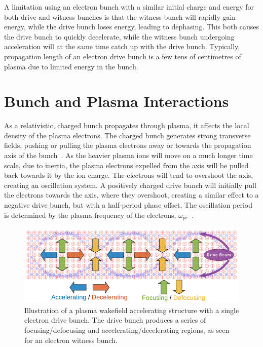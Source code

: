 A limitation using an electron bunch with a similar initial charge and energy for both drive and witness bunches is that the witness bunch will rapidly gain energy, while the drive bunch loses energy, leading to dephasing.
This both causes the drive bunch to quickly decelerate, while the witness bunch undergoing acceleration will at the same time catch up with the drive bunch.
Typically, propagation length of an electron drive bunch is a few tens of centimetres of plasma due to limited energy in the bunch.

\section{Bunch and Plasma Interactions}
\label{Int:BPI}

As a relativistic, charged bunch propagates through plasma, it affects the local density of the plasma electrons.
The charged bunch generates strong transverse fields, pushing or pulling the plasma electrons away or towards the propagation axis of the bunch~\cite{lee:2001,adli:2016b}.
As the heavier plasma ions will move on a much longer time scale, due to inertia, the plasma electrons expelled from the axis will be pulled back towards it by the ion charge.
The electrons will tend to overshoot the axis, creating an oscillation system.
A positively charged drive bunch will initially pull the electrons towards the axis, where they overshoot, creating a similar effect to a negative drive bunch, but with a half-period phase offset.
The oscillation period is determined by the plasma frequency of the electrons, $\omega_{pe}$~\cite{hogan:2016,muggli:2017}. 

\begin{figure}[hbt]
    \centering
    \includegraphics[width=0.85\linewidth]{figures/PlasmaWakefield}
    \caption{\label{Fig:PWFA:Illust} Illustration of a plasma wakefield accelerating structure with a single electron drive bunch.
    The drive bunch produces a series of focusing\slash de\-fo\-cus\-ing and accelerating\slash de\-cel\-e\-rat\-ing regions, as seen for an electron witness bunch.}
\end{figure}

